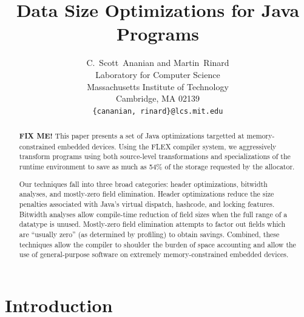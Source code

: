 \documentclass[preprint]{acmconf}
\title{\bf Data Size Optimizations for Java Programs}
\author{C.~Scott~Ananian and Martin~Rinard\\
        Laboratory for Computer Science\\
        Massachusetts Institute of Technology\\ 
        Cambridge, MA 02139 \\ 
        {\tt \{cananian, rinard\}@lcs.mit.edu} }
\begin{document}


\maketitle

\begin{abstract}

{\bf\Large FIX ME! }
This paper presents a set of Java optimizations targetted at
memory-constrained embedded devices.  Using the FLEX compiler system,
we aggressively transform
programs using both source-level transformations and
specializations of the runtime environment to save as much
as 54\% of the storage requested by the allocator.

Our techniques fall into three broad categories: header optimizations,
bitwidth analyses, and mostly-zero field elimination.  Header
optimizations reduce the size penalties associated with 
Java's virtual dispatch, hashcode, and locking features.  Bitwidth
analyses allow compile-time reduction of field sizes when the
full range of a datatype is unused.  Mostly-zero field elimination
attempts to factor out fields which are ``usually zero'' (as
determined by profiling) to obtain savings.  Combined, these
techniques allow the compiler to shoulder the burden of space accounting
and allow the use of general-purpose software on extremely
memory-constrained embedded devices.

\end{abstract}

\section{Introduction}
\end{document}
